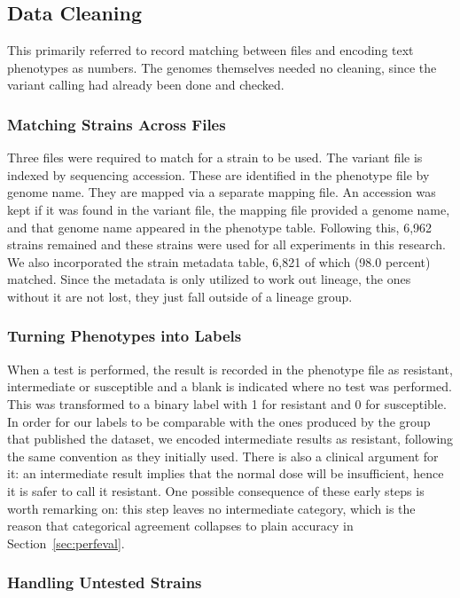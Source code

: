 \FloatBarrier
\subsection{Data Cleaning}

This primarily referred to record matching between files and encoding text phenotypes as
numbers. The genomes themselves needed no cleaning, since the variant calling had already been
done and checked.

\subsubsection{Matching Strains Across Files}

Three files were required to match for a strain to be used. The variant file is indexed by
sequencing accession. These are identified in the phenotype file by genome name. They are
mapped via a separate mapping file. An accession was kept if it was found in the variant file,
the mapping file provided a genome name, and that genome name appeared in the phenotype table.
Following this, 6,962 strains remained and these strains were used for all experiments in this
research. We also incorporated the strain metadata table, 6,821 of which (98.0 percent) matched.
Since the metadata is only utilized to work out lineage, the ones without it are not lost, they
just fall outside of a lineage group.

\subsubsection{Turning Phenotypes into Labels}

When a test is performed, the result is recorded in the phenotype file as resistant,
intermediate or susceptible and a blank is indicated where no test was performed. This was
transformed to a binary label with 1 for resistant and 0 for susceptible. In order for our
labels to be comparable with the ones produced by the group that published the dataset, we
encoded intermediate results as resistant, following the same convention as they initially
used. There is also a clinical argument for it: an intermediate result implies that the normal
dose will be insufficient, hence it is safer to call it resistant. One possible consequence of
these early steps is worth remarking on: this step leaves no intermediate category, which is
the reason that categorical agreement collapses to plain accuracy in
Section~\ref{sec:perfeval}.

\subsubsection{Handling Untested Strains}

